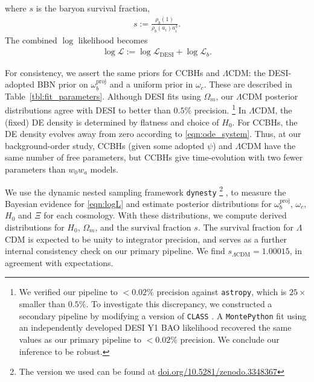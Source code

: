 \documentclass[a4paper,11pt]{article}
\begin{document}
where $s$ is the baryon survival fraction,
\begin{align}
  s := \frac{\rho_b(1)}{\rho_b(a_i)a_i^3}.
\end{align}
The combined $\log$ likelihood becomes
\begin{align}
  \log \mathcal{L} := \log \mathcal{L}_\mathrm{DESI} + \log \mathcal{L}_b. \label{eqn:logL}
\end{align}

For consistency, we assert the same priors for CCBHs and $\Lambda$CDM: the DESI-adopted BBN prior on $\omega_b^\mathrm{proj}$ and a uniform prior in $\omega_c$.
  These are described in Table~\ref{tbl:fit_parameters}.
  Although DESI fits using $\Omega_m$, our $\Lambda$CDM posterior distributions agree with DESI to better than $0.5\%$ precision.%
  \footnote{We verified our pipeline to $<0.02\%$ precision against \texttt{astropy}, which is $25\times$ smaller than $0.5\%$.
  To investigate this discrepancy, we constructed a secondary pipeline by modifying a version of \texttt{CLASS} \cite{BlasLesgourges2011}.
  A \texttt{MontePython} \cite{Audren:2012wb, Brinckmann:2018cvx} fit using an independently developed DESI Y1 BAO likelihood recovered the same values as our primary pipeline to $< 0.02\%$ precision.
  We conclude our inference to be robust.}
In $\Lambda$CDM, the (fixed) DE density is determined by flatness and choice of $H_0$.
For CCBHs, the DE density evolves away from zero according to \cref{eqn:ode_system}.
Thus, at our background-order study, CCBHs (given some adopted $\psi$) and $\Lambda$CDM have the same number of free parameters, but CCBHs give time-evolution with two fewer parameters than $w_0w_a$ models.

We use the dynamic nested sampling framework \texttt{dynesty} \cite{2020MNRAS.493.3132S, 2004AIPC..735..395S, 10.1214/06-BA127, 2019S&C....29..891H, 2009MNRAS.398.1601F}%
\footnote{The version we used can be found at \url{doi.org/10.5281/zenodo.3348367}}%
,  to measure the Bayesian evidence for \cref{eqn:logL} and estimate posterior distributions for $\omega_b^\mathrm{proj}$, $\omega_c$, $H_0$ and $\Xi$ for each cosmology. 
With these distributions, we compute derived distributions for $H_0$, $\Omega_m$, and the survival fraction $s$.
  The survival fraction for $\Lambda$CDM is expected to be unity to integrator precision, and serves as a further internal consistency check on our primary pipeline.
  We find $s_{\Lambda\mathrm{CDM}} = 1.00015$, in agreement with expectations.
\end{document}
